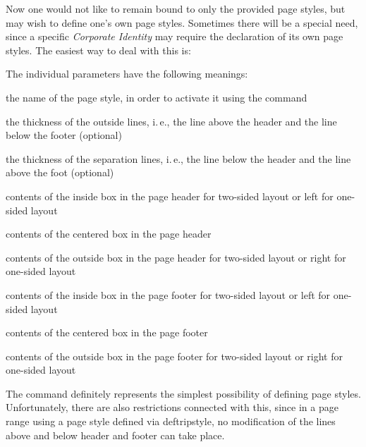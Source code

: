Now one would not like to remain bound to only the provided page
styles, but may wish to define one's own page styles.  Sometimes there
will be a special need, since a specific \emph{Corporate Identity} may
require the declaration of its own page styles.  The easiest way to
deal with this is:
\begin{Declaration}
\end{Declaration}%
The individual parameters have the following meanings:
\begin{labeling}[\,--]{}
\item[\PName{name}] the name of the page style, in order to activate it
        using the command 
\item[\PName{LO}] the thickness of the outside lines,
        i.\,e., the line above the header
        and the line below the footer (optional)
\item[\PName{LI}] the thickness of the separation lines,
        i.\,e., the line below the header
        and the line above the foot (optional)
\item[\PName{HI}] contents of the inside box in the page header for two-sided
        layout or left for one-sided layout
\item[\PName{HC}] contents of the centered box in the page header
\item[\PName{HO}] contents of the outside box in the page header for two-sided
        layout or right for one-sided layout
\item[\PName{FI}] contents of the inside box in the page footer for two-sided
        layout or left for one-sided layout
\item[\PName{FC}] contents of the centered box in the page footer
\item[\PName{FO}] contents of the outside box in the page footer for two-sided
        layout or right for one-sided layout
\end{labeling}

The command  definitely represents the simplest
possibility of defining page styles.  Unfortunately, there are also
restrictions connected with this, since in a page range using a page
style defined via deftripstyle, no modification of the lines above and
below header and footer can take place.

